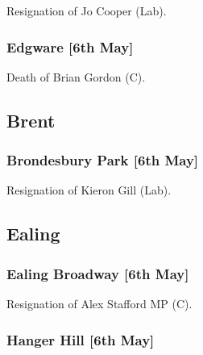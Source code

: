 \documentclass[a4paper,openany]{book}
\begin{document}
\begin{resultsiii}

Resignation of Jo Cooper (Lab).

\subsubsection*{Edgware \hspace*{\fill}\nolinebreak[1]%
	\enspace\hspace*{\fill}
	[6th May]}


Death of Brian Gordon (C).

\subsection*{Brent}

\subsubsection*{Brondesbury Park \hspace*{\fill}\nolinebreak[1]%
	\enspace\hspace*{\fill}
	[6th May]}


Resignation of Kieron Gill (Lab).

\subsection*{Ealing}

\subsubsection*{Ealing Broadway \hspace*{\fill}\nolinebreak[1]%
	\enspace\hspace*{\fill}
	[6th May]}


Resignation of Alex Stafford MP (C).

\subsubsection*{Hanger Hill \hspace*{\fill}\nolinebreak[1]%
	\enspace\hspace*{\fill}
	[6th May]}


\end{resultsiii}
\end{document}
